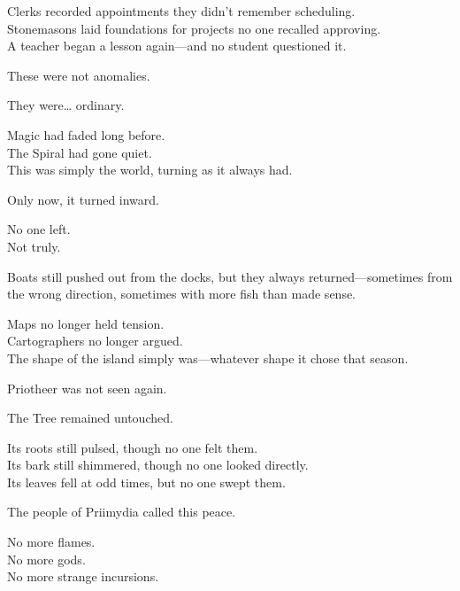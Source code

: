 \documentclass[9pt]{article}
\begin{document}
\vspace{0.5em}
Clerks recorded appointments they didn’t remember scheduling.\\
Stonemasons laid foundations for projects no one recalled approving.\\
A teacher began a lesson again---and no student questioned it.

\vspace{0.5em}
These were not anomalies.

\vspace{0.5em}
They were\ldots{} ordinary.

\vspace{0.5em}
Magic had faded long before.\\
The Spiral had gone quiet.\\
This was simply the world, turning as it always had.

\vspace{0.5em}
Only now, it turned inward.

\vspace{0.5em}
No one left.\\
Not truly.

\vspace{0.5em}
Boats still pushed out from the docks, but they always returned---sometimes from the wrong direction, sometimes with more fish than made sense.

\vspace{0.5em}
Maps no longer held tension.\\
Cartographers no longer argued.\\
The shape of the island simply was---whatever shape it chose that season.

\vspace{0.5em}
Priotheer was not seen again.

\vspace{0.5em}
The Tree remained untouched.

\vspace{0.5em}
Its roots still pulsed, though no one felt them.\\
Its bark still shimmered, though no one looked directly.\\
Its leaves fell at odd times, but no one swept them.

\vspace{0.5em}
The people of Priimydia called this peace.

\vspace{0.5em}
No more flames.\\
No more gods.\\
No more strange incursions.
\end{document}
